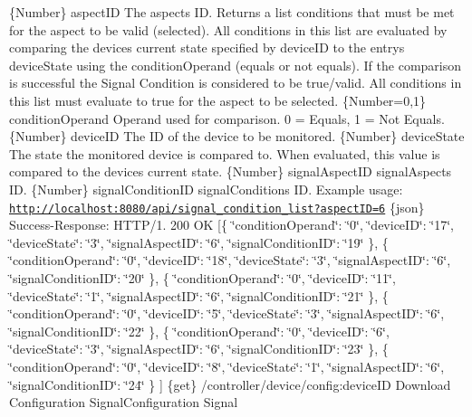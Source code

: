 \{Number\} aspect\+ID The aspect\textquotesingle{}s ID.  Returns a list conditions that must be met for the aspect to be valid (selected). All conditions in this list are evaluated by comparing the device\textquotesingle{}s current state specified by device\+ID to the entry\textquotesingle{}s device\+State using the condition\+Operand (equals or not equals). If the comparison is successful the Signal Condition is considered to be true/valid. All conditions in this list must evaluate to true for the aspect to be selected.  \{Number=0,1\} condition\+Operand Operand used for comparison. 0 = Equals, 1 = Not Equals.  \{Number\} device\+ID The ID of the device to be monitored.  \{Number\} device\+State The state the monitored device is compared to. When evaluated, this value is compared to the device\textquotesingle{}s current state.  \{Number\} signal\+Aspect\+ID signal\+Aspect\textquotesingle{}s ID.  \{Number\} signal\+Condition\+ID signal\+Condition\textquotesingle{}s ID.  Example usage\+: \href{http://localhost:8080/api/signal_condition_list?aspectID=6}{\tt http\+://localhost\+:8080/api/signal\+\_\+condition\+\_\+list?aspect\+I\+D=6}  \{json\} Success-\/\+Response\+: H\+T\+T\+P/1. 200 OK \mbox{[}\{ \char`\"{}condition\+Operand\char`\"{}\+: \char`\"{}0\char`\"{}, \char`\"{}device\+I\+D\char`\"{}\+: \char`\"{}17\char`\"{}, \char`\"{}device\+State\char`\"{}\+: \char`\"{}3\char`\"{}, \char`\"{}signal\+Aspect\+I\+D\char`\"{}\+: \char`\"{}6\char`\"{}, \char`\"{}signal\+Condition\+I\+D\char`\"{}\+: \char`\"{}19\char`\"{} \}, \{ \char`\"{}condition\+Operand\char`\"{}\+: \char`\"{}0\char`\"{}, \char`\"{}device\+I\+D\char`\"{}\+: \char`\"{}18\char`\"{}, \char`\"{}device\+State\char`\"{}\+: \char`\"{}3\char`\"{}, \char`\"{}signal\+Aspect\+I\+D\char`\"{}\+: \char`\"{}6\char`\"{}, \char`\"{}signal\+Condition\+I\+D\char`\"{}\+: \char`\"{}20\char`\"{} \}, \{ \char`\"{}condition\+Operand\char`\"{}\+: \char`\"{}0\char`\"{}, \char`\"{}device\+I\+D\char`\"{}\+: \char`\"{}11\char`\"{}, \char`\"{}device\+State\char`\"{}\+: \char`\"{}1\char`\"{}, \char`\"{}signal\+Aspect\+I\+D\char`\"{}\+: \char`\"{}6\char`\"{}, \char`\"{}signal\+Condition\+I\+D\char`\"{}\+: \char`\"{}21\char`\"{} \}, \{ \char`\"{}condition\+Operand\char`\"{}\+: \char`\"{}0\char`\"{}, \char`\"{}device\+I\+D\char`\"{}\+: \char`\"{}5\char`\"{}, \char`\"{}device\+State\char`\"{}\+: \char`\"{}3\char`\"{}, \char`\"{}signal\+Aspect\+I\+D\char`\"{}\+: \char`\"{}6\char`\"{}, \char`\"{}signal\+Condition\+I\+D\char`\"{}\+: \char`\"{}22\char`\"{} \}, \{ \char`\"{}condition\+Operand\char`\"{}\+: \char`\"{}0\char`\"{}, \char`\"{}device\+I\+D\char`\"{}\+: \char`\"{}6\char`\"{}, \char`\"{}device\+State\char`\"{}\+: \char`\"{}3\char`\"{}, \char`\"{}signal\+Aspect\+I\+D\char`\"{}\+: \char`\"{}6\char`\"{}, \char`\"{}signal\+Condition\+I\+D\char`\"{}\+: \char`\"{}23\char`\"{} \}, \{ \char`\"{}condition\+Operand\char`\"{}\+: \char`\"{}0\char`\"{}, \char`\"{}device\+I\+D\char`\"{}\+: \char`\"{}8\char`\"{}, \char`\"{}device\+State\char`\"{}\+: \char`\"{}1\char`\"{}, \char`\"{}signal\+Aspect\+I\+D\char`\"{}\+: \char`\"{}6\char`\"{}, \char`\"{}signal\+Condition\+I\+D\char`\"{}\+: \char`\"{}24\char`\"{} \} \mbox{]}  \{get\} /controller/device/config\+:device\+ID Download Configuration  Signal\+Configuration  Signal

